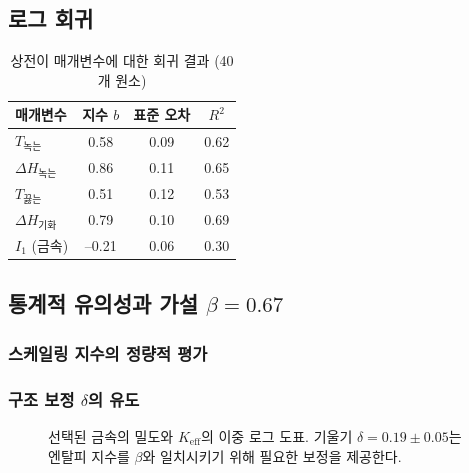 \documentclass[11pt,a4paper]{article}
\newcommand{\Keff}{K_{\mathrm{eff}}}
\begin{document}
	\subsection{로그 회귀}
	\begin{table}[htbp]
		\centering
		\caption{상전이 매개변수에 대한 회귀 결과 (40개 원소)}
		\label{tab:regression}
		\begin{tabular}{@{}lccc@{}}
			\toprule
			\textbf{매개변수} & \textbf{지수 }\(b\) & \textbf{표준 오차} & \textbf{\(R^2\)} \\
			\midrule
			\(T_{\text{녹는}}\)   & 0.58 & 0.09 & 0.62 \\
			\(\Delta H_{\text{녹는}}\) & 0.86 & 0.11 & 0.65 \\
			\(T_{\text{끓는}}\)   & 0.51 & 0.12 & 0.53 \\
			\(\Delta H_{\text{기화}}\) & 0.79 & 0.10 & 0.69 \\
			\(I_1\) (금속)      & --0.21 & 0.06 & 0.30 \\
			\bottomrule
		\end{tabular}
	\end{table}
	
	\subsection{통계적 유의성과 가설 \(\beta = 0.67\)}
	\subsubsection{스케일링 지수의 정량적 평가}
	\subsubsection{구조 보정 \(\delta\)의 유도}
	
	\begin{figure}[htbp]
		\centering
		\caption{선택된 금속의 밀도와 \(\Keff\)의 이중 로그 도표. 기울기 \(\delta = 0.19 \pm 0.05\)는 엔탈피 지수를 \(\beta\)와 일치시키기 위해 필요한 보정을 제공한다.}
		\label{fig:density_scaling}
	\end{figure}
	
\end{document}
